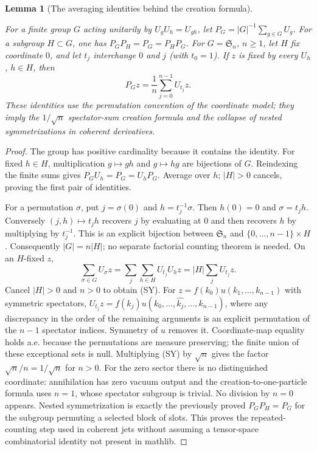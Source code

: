 \documentclass[11pt,a4paper]{article}
\newtheorem{lemma}[theorem]{Lemma}
\theoremstyle{definition}
\theoremstyle{remark}
\newcommand{\proofid}[1]{\par\smallskip{\normalfont\scriptsize\color{inkblue}Stable ID: \nolinkurl{#1}}\par\smallskip}
\begin{document}
\begin{lemma}[The averaging identities behind the creation formula]
\label{bridge:symmetrizer}
\proofid{bridge:symmetrizer}
\par{}\par\smallskip
For a finite group $G$ acting unitarily by $U_gU_h=U_{gh}$, let
$P_G=|G|^{-1}\sum_{g\in G}U_g$.
For a subgroup $H\subset G$, one has $P_GP_H=P_G=P_HP_G$.
For $G=\mathfrak S_n$, $n\geq1$, let $H$ fix coordinate $0$, and
let $t_j$ interchange $0$ and $j$ (with $t_0=1$).
If $z$ is fixed by every $U_h$, $h\in H$, then
\[
 P_Gz=\frac1n\sum_{j=0}^{n-1}U_{t_j}z.               \tag{SY}
\]
These identities use the permutation convention of the coordinate
model; they imply the $1/\sqrt n$ spectator-sum creation formula and
the collapse of nested symmetrizations in coherent derivatives.
\end{lemma}
\begin{proof}
The group has positive cardinality because it contains the identity.
For fixed $h\in H$, multiplication $g\mapsto gh$ and $g\mapsto hg$
are bijections of $G$. Reindexing the finite sums gives
$P_GU_h=P_G=U_hP_G$. Average over $h$; $|H|>0$ cancels, proving the
first pair of identities.

For a permutation $\sigma$, put $j=\sigma(0)$ and
$h=t_j^{-1}\sigma$. Then $h(0)=0$ and $\sigma=t_jh$.
Conversely $(j,h)\mapsto t_jh$ recovers $j$ by evaluating at $0$ and
then recovers $h$ by multiplying by $t_j^{-1}$. This is an explicit
bijection between $\mathfrak S_n$ and $\{0,\ldots,n-1\}\times H$.
Consequently $|G|=n|H|$; no separate factorial counting theorem is
needed. On an $H$-fixed $z$,
\[
 \sum_{\sigma\in G}U_\sigma z
 =\sum_j\sum_{h\in H}U_{t_j}U_hz
 =|H|\sum_j U_{t_j}z.
\]
Cancel $|H|>0$ and $n>0$ to obtain (SY).
For $z=f(k_0)u(k_1,\ldots,k_{n-1})$ with symmetric spectators,
$U_{t_j}z=f(k_j)u(k_0,\ldots,\widehat{k_j},\ldots,k_{n-1})$,
where any discrepancy in the order of the remaining arguments is an
explicit permutation of the $n-1$ spectator indices. Symmetry of $u$
removes it. Coordinate-map equality holds a.e. because the permutations
are measure preserving; the finite union of these exceptional sets is
null. Multiplying (SY) by $\sqrt n$ gives the factor
$\sqrt n/n=1/\sqrt n$ for $n>0$.
For the zero sector there is no distinguished coordinate: annihilation
has zero vacuum output and the creation-to-one-particle formula uses
$n=1$, whose spectator subgroup is trivial. No division by $n=0$
appears. Nested symmetrization is exactly the previously proved
$P_GP_H=P_G$ for the subgroup permuting a selected block of slots.
This proves the repeated-counting step used in coherent jets without
assuming a tensor-space combinatorial identity not present in mathlib.
\end{proof}
\end{document}
